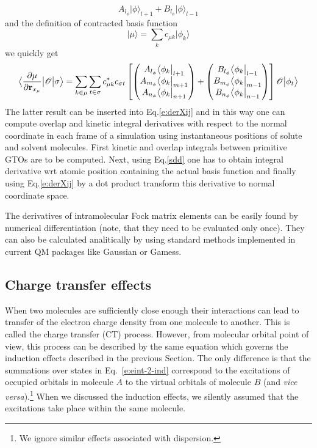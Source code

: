 \documentclass[a4paper,titlepage,twoside,fleqn,12pt]{book}
\newcommand{\bra}[1]{\ensuremath{\bigl\langle {#1} \bigl\lvert}}
\newcommand{\ket}[1]{\ensuremath{\bigr\rvert {#1} \bigr\rangle}}
\newcommand{\tbraket}[3]{\ensuremath{\bigl\langle {#1} \bigl\lvert {#2} \bigl\lvert {#3} \bigr\rangle}}
\newcommand{\fderiv}[2]{\ensuremath{
\frac{\partial #1}{\partial #2}}}
\begin{document}
\begin{refsection}
\begin{equation}
A_{l_\phi}  \ket{\phi}_{l+1} + B_{l_\phi}  \ket{\phi}_{l-1}
\end{equation}
%
and the definition of contracted basis function
%
\begin{equation}\label{muorb}
\ket{\mu} = \sum_k c_{\mu k} \ket{\phi_k}
\end{equation}
%
we quickly get
%
\begin{equation}\label{sdd}
\tbraket{\fderiv{\mu}{{\bf r}_{x_\mu}}}{ \mathscr{O} }{\sigma} =
\sum_{k\in\mu}\sum_{t\in\sigma}
c_{\mu k}^*c_{\sigma t}
  \left[
  \begin{pmatrix}
  A_{l_\phi} \bra{\phi_k}_{l+1} \\ 
  A_{m_\phi} \bra{\phi_k}_{m+1} \\ 
  A_{n_\phi} \bra{\phi_k}_{n+1}
  \end{pmatrix}
+
  \begin{pmatrix}
  B_{l_\phi} \bra{\phi_k}_{l-1} \\ 
  B_{m_\phi} \bra{\phi_k}_{m-1} \\ 
  B_{n_\phi} \bra{\phi_k}_{n-1}
  \end{pmatrix}
  \right]
\mathscr{O}\ket{\phi_t}
\end{equation}
%
The latter result can be inserted into Eq.\eqref{e:derXij} and in this way
one can compute overlap and kinetic integral derivatives with respect to the normal coordinate
in each frame of a simulation using instantaneous positions of solute and solvent molecules.
First kinetic and overlap integrals between primitive GTOs are to be computed. Next,
using Eq.\eqref{sdd} one has to obtain integral derivative wrt atomic position
containing the actual basis function and finally using Eq.\eqref{e:derXij} by a dot product
transform this derivative to normal coordinate space.

The derivatives of intramolecular Fock matrix elements can be easily found
by numerical  differentiation (note, that they need to be evaluated only once).
They can also be calculated analitically by using standard methods implemented
in current QM packages like {\sc Gaussian} or {\sc Gamess}.

\subsection{Charge transfer effects}

When two molecules are sufficiently close enough
their interactions can lead to transfer of the 
electron charge density from one molecule to another.
This is called the charge transfer (CT) process.
However, from molecular orbital point of view, this process can be 
described by the same equation which governs the induction
effects described in the previous Section. The only difference
is that the summations over states in Eq.~\eqref{e:eint-2-ind} correspond to 
the excitations of occupied orbitals in molecule $A$ to
the virtual orbitals of molecule $B$ (and \emph{vice versa}).\footnote{We ignore similar effects
associated with dispersion.} 
When we discussed the induction effects, we silently assumed that
the excitations take place within the same molecule. 


\end{refsection}
\end{document}
